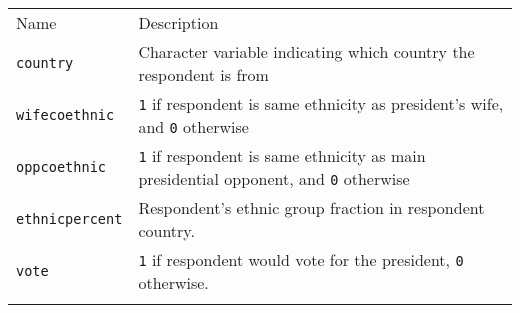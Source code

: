 \documentclass[]{article}
\begin{document}
\begin{longtable}[c]{@{}ll@{}}
\toprule\addlinespace
\begin{minipage}[b]{0.34\columnwidth}\raggedright
Name
\end{minipage} & \begin{minipage}[b]{0.59\columnwidth}\raggedright
Description
\end{minipage}
\\\addlinespace
\midrule\endhead
\begin{minipage}[t]{0.34\columnwidth}\raggedright
\texttt{country}
\end{minipage} & \begin{minipage}[t]{0.59\columnwidth}\raggedright
Character variable indicating which country the respondent is from
\end{minipage}
\\\addlinespace
\begin{minipage}[t]{0.34\columnwidth}\raggedright
\texttt{wifecoethnic}
\end{minipage} & \begin{minipage}[t]{0.59\columnwidth}\raggedright
\texttt{1} if respondent is same ethnicity as president's wife, and
\texttt{0} otherwise
\end{minipage}
\\\addlinespace
\begin{minipage}[t]{0.34\columnwidth}\raggedright
\texttt{oppcoethnic}
\end{minipage} & \begin{minipage}[t]{0.59\columnwidth}\raggedright
\texttt{1} if respondent is same ethnicity as main presidential
opponent, and \texttt{0} otherwise
\end{minipage}
\\\addlinespace
\begin{minipage}[t]{0.34\columnwidth}\raggedright
\texttt{ethnicpercent}
\end{minipage} & \begin{minipage}[t]{0.59\columnwidth}\raggedright
Respondent's ethnic group fraction in respondent country.
\end{minipage}
\\\addlinespace
\begin{minipage}[t]{0.34\columnwidth}\raggedright
\texttt{vote}
\end{minipage} & \begin{minipage}[t]{0.59\columnwidth}\raggedright
\texttt{1} if respondent would vote for the president, \texttt{0}
otherwise.
\end{minipage}
\\\addlinespace
\bottomrule
\end{longtable}
\end{document}
